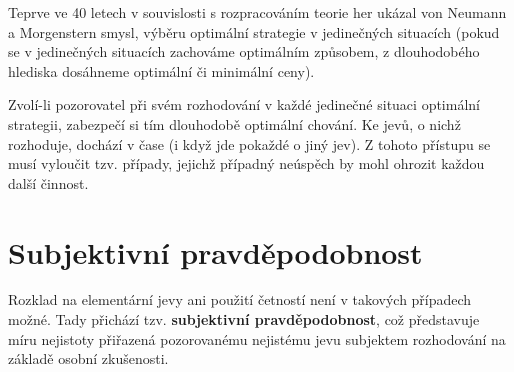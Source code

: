 	Teprve ve 40 letech v souvislosti s rozpracováním teorie her ukázal von Neumann a Morgenstern smysl, výběru optimální strategie v jedinečných situacích (pokud se v jedinečných situacích zachováme optimálním způsobem, z dlouhodobého hlediska dosáhneme optimální či minimální ceny).\br

	Zvolí-li pozorovatel při svém rozhodování v každé jedinečné situaci optimální strategii, zabezpečí si tím dlouhodobě optimální chování. Ke  jevů, o nichž rozhoduje, dochází v čase  (i když jde pokaždé o jiný jev). Z tohoto přístupu se musí vyloučit tzv.  případy, jejichž případný neúspěch by mohl ohrozit každou další činnost.

	\section{Subjektivní pravděpodobnost}
	Rozklad na elementární jevy ani použití četností není v takových případech možné. Tady přichází tzv. \textbf{subjektivní pravděpodobnost}, což představuje míru nejistoty přiřazená pozorovanému nejistému jevu subjektem rozhodování na základě osobní zkušenosti.

